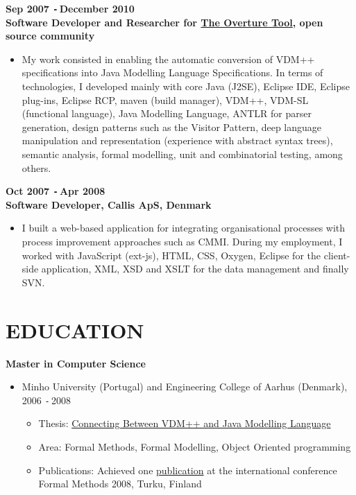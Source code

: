 \documentclass{res}
\def\Minus{\texttt{-}\,}
\begin{document}
\begin{resume}
  {\bf Sep 2007 \Minus December 2010}\\
  {\bf Software Developer and Researcher for \href{http://www.overturetool.org}{The Overture Tool}, open source community}
        \begin{itemize}
        \item[] My work consisted in enabling the automatic conversion of VDM++ specifications into Java Modelling Language Specifications. In terms of technologies, I developed mainly with core Java (J2SE), Eclipse IDE, Eclipse plug-ins, Eclipse RCP, maven (build manager), VDM++, VDM-SL (functional language), Java Modelling Language, ANTLR for parser generation, design patterns such as the Visitor Pattern, deep language manipulation and representation (experience with abstract syntax trees), semantic analysis, formal modelling, unit and combinatorial testing, among others.
       \end{itemize}

  {\bf Oct 2007 \Minus Apr 2008}\\
  {\bf Software Developer, Callis ApS, Denmark}
        \begin{itemize}
        \item[] I built a web-based application for integrating organisational processes with process improvement approaches such as CMMI.
During my employment, I worked with JavaScript (ext-js), HTML, CSS, Oxygen, Eclipse for the client-side application, XML, XSD and XSLT for the data management and finally SVN.
        \end{itemize}

\section{EDUCATION}
\vspace{0.1in}

    {\bf Master in Computer Science}
    \begin{itemize}
      \item[] Minho University (Portugal) and Engineering College of Aarhus (Denmark), 2006 \Minus 2008
      \begin{itemize}
        \item Thesis: \href{http://wiki.overturetool.org/images/4/44/ConnectingVDMppJML.pdf}{Connecting Between VDM++ and Java Modelling Language}
        \item Area: Formal Methods, Formal Modelling, Object Oriented programming
        \item Publications: Achieved one \href{http://www.cs.ncl.ac.uk/publications/trs/papers/1099.pdf}{publication} at the international conference Formal Methods 2008, Turku, Finland
      \end{itemize}
    \end{itemize}


\end{resume}
\end{document}

